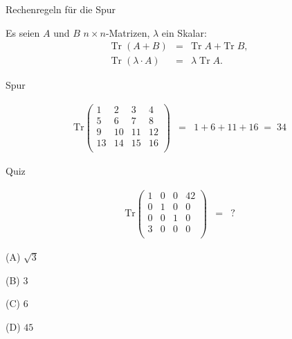 \documentclass[german]{beamer}
\newcommand{\bq}{\begin{eqnarray*}}
\newcommand{\eq}{\end{eqnarray*}}
\begin{document}
\begin{frame}{Rechenregeln f\"ur die Spur}

Es seien $A$ und $B$ $n\times n$-Matrizen, $\lambda$ ein Skalar:
\bq
 \mbox{Tr} \; \left( A + B \right) & = & \mbox{Tr}\; A + \mbox{Tr}\; B,
 \nonumber \\
 \mbox{Tr} \; \left( \lambda \cdot A \right) & = & \lambda \; \mbox{Tr} \; A.
\eq

\end{frame}

\begin{frame}{Spur}

\begin{example}
\bq
 \mbox{Tr}
\left( \begin{array}{rrrr}
 1 & 2 & 3 & 4 \\
 5 & 6 & 7 & 8 \\
 9 & 10 & 11 & 12 \\
 13 & 14 & 15 & 16 \\
\end{array} \right)
 & = & 
 1 + 6 + 11 +16
 \; = \;
 34
\eq
\end{example}

\end{frame}

\begin{frame}{Quiz}

\bq
 \mbox{Tr}
\left( \begin{array}{rrrr}
 1 & 0 & 0 & 42 \\
 0 & 1 & 0 & 0 \\
 0 & 0 & 1 & 0 \\
 3 & 0 & 0 & 0 \\
\end{array} \right)
 & = & ?
\eq
\begin{description}
\item{(A)} $\sqrt{3}$
\item{(B)} $3$
\item{(C)} $6$
\item{(D)} $45$
\end{description}

\end{frame}
\end{document}
